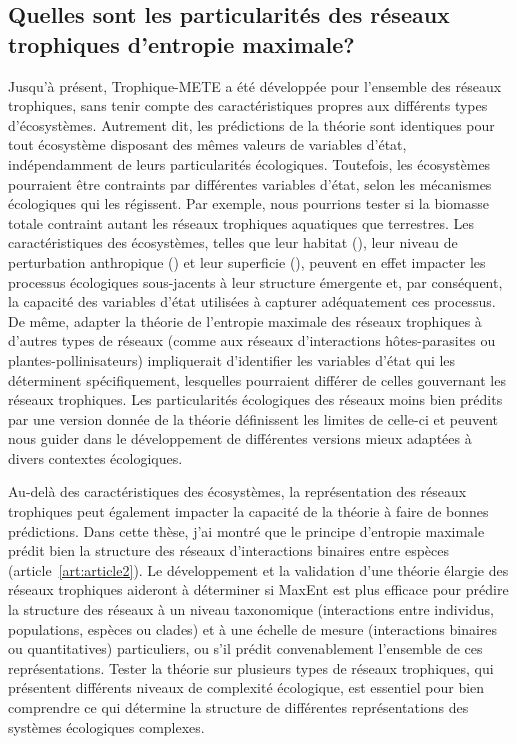 \subsection{Quelles sont les particularités des réseaux trophiques d'entropie maximale?} 

Jusqu'à présent, Trophique-METE a été développée pour l'ensemble des réseaux
trophiques, sans tenir compte des caractéristiques propres aux différents types
d'écosystèmes. Autrement dit, les prédictions de la théorie sont identiques pour
tout écosystème disposant des mêmes valeurs de variables d'état, indépendamment
de leurs particularités écologiques. Toutefois, les écosystèmes pourraient être
contraints par différentes variables d'état, selon les mécanismes écologiques
qui les régissent. Par exemple, nous pourrions tester si la biomasse totale
contraint autant les réseaux trophiques aquatiques que terrestres. Les
caractéristiques des écosystèmes, telles que leur habitat
(\cite{Shurin2005All}), leur niveau de perturbation anthropique
(\cite{Tylianakis2007Habitat}) et leur superficie (\cite{Galiana2018Spatiala}),
peuvent en effet impacter les processus écologiques sous-jacents à leur
structure émergente et, par conséquent, la capacité des variables d'état
utilisées à capturer adéquatement ces processus. De même, adapter la théorie de
l'entropie maximale des réseaux trophiques à d'autres types de réseaux (comme
aux réseaux d'interactions hôtes-parasites ou plantes-pollinisateurs)
impliquerait d'identifier les variables d'état qui les déterminent
spécifiquement, lesquelles pourraient différer de celles gouvernant les réseaux
trophiques. Les particularités écologiques des réseaux moins bien prédits par
une version donnée de la théorie définissent les limites de celle-ci et peuvent
nous guider dans le développement de différentes versions mieux adaptées à
divers contextes écologiques.

Au-delà des caractéristiques des écosystèmes, la représentation des réseaux
trophiques peut également impacter la capacité de la théorie à faire de bonnes
prédictions. Dans cette thèse, j'ai montré que le principe d'entropie maximale
prédit bien la structure des réseaux d'interactions binaires entre espèces
(article~\ref{art:article2}). Le développement et la validation d'une théorie
élargie des réseaux trophiques aideront à déterminer si MaxEnt est plus efficace
pour prédire la structure des réseaux à un niveau taxonomique (interactions
entre individus, populations, espèces ou clades) et à une échelle de mesure
(interactions binaires ou quantitatives) particuliers, ou s'il prédit
convenablement l'ensemble de ces représentations. Tester la théorie sur
plusieurs types de réseaux trophiques, qui présentent différents niveaux de
complexité écologique, est essentiel pour bien comprendre ce qui détermine la
structure de différentes représentations des systèmes écologiques complexes. 

